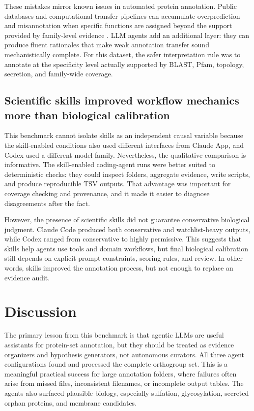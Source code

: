 \documentclass[11pt]{article}
\begin{document}
These mistakes mirror known issues in automated protein annotation. Public databases and computational transfer pipelines can accumulate overprediction and misannotation when specific functions are assigned beyond the support provided by family-level evidence \citep{Schnoes2009}. LLM agents add an additional layer: they can produce fluent rationales that make weak annotation transfer sound mechanistically complete. For this dataset, the safer interpretation rule was to annotate at the specificity level actually supported by BLAST, Pfam, topology, secretion, and family-wide coverage.

\subsection{Scientific skills improved workflow mechanics more than biological calibration}

This benchmark cannot isolate skills as an independent causal variable because the skill-enabled conditions also used different interfaces from Claude App, and Codex used a different model family. Nevertheless, the qualitative comparison is informative. The skill-enabled coding-agent runs were better suited to deterministic checks: they could inspect folders, aggregate evidence, write scripts, and produce reproducible TSV outputs. That advantage was important for coverage checking and provenance, and it made it easier to diagnose disagreements after the fact.

However, the presence of scientific skills did not guarantee conservative biological judgment. Claude Code produced both conservative and watchlist-heavy outputs, while Codex ranged from conservative to highly permissive. This suggests that skills help agents use tools and domain workflows, but final biological calibration still depends on explicit prompt constraints, scoring rules, and review. In other words, skills improved the annotation process, but not enough to replace an evidence audit.

\section{Discussion}

The primary lesson from this benchmark is that agentic LLMs are useful assistants for protein-set annotation, but they should be treated as evidence organizers and hypothesis generators, not autonomous curators. All three agent configurations found and processed the complete orthogroup set. This is a meaningful practical success for large annotation folders, where failures often arise from missed files, inconsistent filenames, or incomplete output tables. The agents also surfaced plausible biology, especially sulfation, glycosylation, secreted orphan proteins, and membrane candidates.
\end{document}
